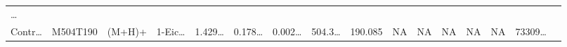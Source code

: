 \documentclass[
]{article}
\begin{document}
\begin{longtable}[]{@{}llllllllllllllll@{}}
\begin{minipage}[t]{0.02\columnwidth}
\ldots{}\strut
\end{minipage}\tabularnewline
\begin{minipage}[t]{0.04\columnwidth}\raggedright
Contr\ldots{}\strut
\end{minipage} & \begin{minipage}[t]{0.04\columnwidth}\raggedright
M504T190\strut
\end{minipage} & \begin{minipage}[t]{0.04\columnwidth}\raggedright
(M+H)+\strut
\end{minipage} & \begin{minipage}[t]{0.04\columnwidth}\raggedright
1-Eic\ldots{}\strut
\end{minipage} & \begin{minipage}[t]{0.04\columnwidth}\raggedright
1.429\ldots{}\strut
\end{minipage} & \begin{minipage}[t]{0.04\columnwidth}\raggedright
0.178\ldots{}\strut
\end{minipage} & \begin{minipage}[t]{0.04\columnwidth}\raggedright
0.002\ldots{}\strut
\end{minipage} & \begin{minipage}[t]{0.04\columnwidth}\raggedright
504.3\ldots{}\strut
\end{minipage} & \begin{minipage}[t]{0.04\columnwidth}\raggedright
190.085\strut
\end{minipage} & \begin{minipage}[t]{0.04\columnwidth}\raggedright
NA\strut
\end{minipage} & \begin{minipage}[t]{0.03\columnwidth}\raggedright
NA\strut
\end{minipage} & \begin{minipage}[t]{0.04\columnwidth}\raggedright
NA\strut
\end{minipage} & \begin{minipage}[t]{0.04\columnwidth}\raggedright
NA\strut
\end{minipage} & \begin{minipage}[t]{0.04\columnwidth}\raggedright
NA\strut
\end{minipage} & \begin{minipage}[t]{0.04\columnwidth}\raggedright
73309\ldots{}\strut
\end{minipage} & \begin{minipage}[t]{0.02\columnwidth}\raggedright

\end{minipage}
\end{longtable}
\end{document}
